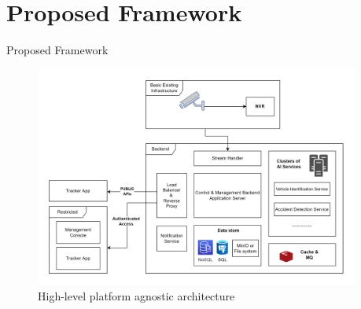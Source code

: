\documentclass{beamer}
\begin{document}

\section{Proposed Framework}
\begin{frame}{Proposed Framework}
	\begin{figure}
		\includegraphics[width=0.95\textwidth]{res/architecture_high_level.png}
		\caption{High-level platform agnostic architecture}
	\end{figure}
\end{frame}

\end{document}
